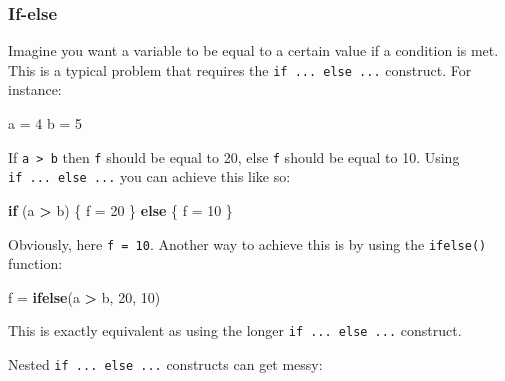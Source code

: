 \documentclass[]{gitbook}
\newenvironment{Shaded}{\begin{snugshade}}{\end{snugshade}}
\newcommand{\ControlFlowTok}[1]{\textcolor[rgb]{0.13,0.29,0.53}{\textbf{#1}}}
\newcommand{\DecValTok}[1]{\textcolor[rgb]{0.00,0.00,0.81}{#1}}
\newcommand{\KeywordTok}[1]{\textcolor[rgb]{0.13,0.29,0.53}{\textbf{#1}}}
\newcommand{\NormalTok}[1]{#1}
\newcommand{\OperatorTok}[1]{\textcolor[rgb]{0.81,0.36,0.00}{\textbf{#1}}}
\newcommand{\StringTok}[1]{\textcolor[rgb]{0.31,0.60,0.02}{#1}}
\theoremstyle{definition}
\theoremstyle{definition}
\theoremstyle{definition}
\theoremstyle{remark}
\begin{document}
\hypertarget{if-else}{%
\subsubsection{If-else}\label{if-else}}

Imagine you want a variable to be equal to a certain value if a
condition is met. This is a typical problem that requires the
\texttt{if\ ...\ else\ ...} construct. For instance:

\begin{Shaded}
\begin{Highlighting}[]
\NormalTok{a =}\StringTok{ }\DecValTok{4}
\NormalTok{b =}\StringTok{ }\DecValTok{5}
\end{Highlighting}
\end{Shaded}

If \texttt{a\ \textgreater{}\ b} then \texttt{f} should be equal to 20,
else \texttt{f} should be equal to 10. Using \texttt{if\ ...\ else\ ...}
you can achieve this like so:

\begin{Shaded}
\begin{Highlighting}[]
\ControlFlowTok{if}\NormalTok{ (a }\OperatorTok{>}\StringTok{ }\NormalTok{b) \{}
\NormalTok{  f =}\StringTok{ }\DecValTok{20}
\NormalTok{    \} }\ControlFlowTok{else}\NormalTok{ \{}
\NormalTok{  f =}\StringTok{ }\DecValTok{10}
\NormalTok{\}}
\end{Highlighting}
\end{Shaded}

Obviously, here \texttt{f\ =\ 10}. Another way to achieve this is by
using the \texttt{ifelse()} function:

\begin{Shaded}
\begin{Highlighting}[]
\NormalTok{f =}\StringTok{ }\KeywordTok{ifelse}\NormalTok{(a }\OperatorTok{>}\StringTok{ }\NormalTok{b, }\DecValTok{20}\NormalTok{, }\DecValTok{10}\NormalTok{)}
\end{Highlighting}
\end{Shaded}

This is exactly equivalent as using the longer
\texttt{if\ ...\ else\ ...} construct.

Nested \texttt{if\ ...\ else\ ...} constructs can get messy:

\begin{Shaded}
\end{Shaded}
\end{document}

